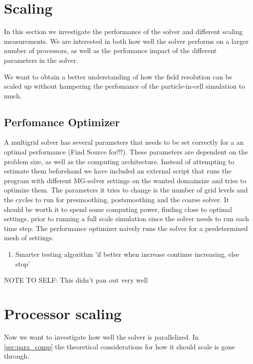\section{Scaling}
  In this section we investigate the performance of the solver and different scaling
  measurements. We are interested in both how well the solver performs on a larger
  number of processors, as well as the perfomance impact of the different
  parameters in the solver.

  We want to obtain a better understanding of how the field resolution can be scaled
  up without hampering the perfomance of the particle-in-cell simulation to much.

  \subsection{Perfomance Optimizer}
    A multigrid solver has several parameters that needs to be set correctly for
    a an optimal performance (Find Source for!!!). These parameters are dependent on the problem size,
    as well as the computing architecture. Instead of attempting to estimate them beforehand
    we have included an external script that runs the program with different MG-solver
    settings on the wanted domainsize and tries to optimize them.
    The parameters it tries to change is the number of grid levels and the cycles
    to run for presmoothing, postsmoothing and the coarse solver. It should be worth it
    to spend some computing power, finding close to optimal settings,  prior to
    running a full scale simulation since the solver needs to run each time step.
    The performance optimizer naively runs the solver for a predetermined mesh of
    settings.

    \begin{enumerate}
      \item Smarter testing algorithm 'if better when increase continue increasing, else stop'
    \end{enumerate}

	NOTE TO SELF: This didn't pan out very well

	\section{Processor scaling}
		Now we want to investigate how well the solver is parallelized. In \cref{sec:para_comp}
		the theoretical considerations for how it should scale is gone through.
